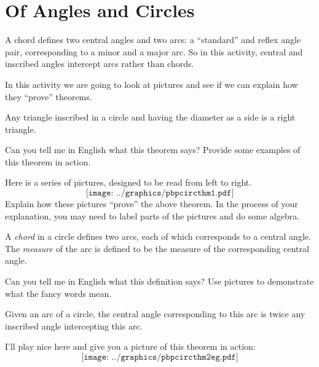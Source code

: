 \newpage
\section{Of Angles and Circles} %

\begin{teachingnote}
A chord defines two central angles and two arcs: a ``standard'' and reflex angle pair, corresponding to a minor and a major arc.  So in this activity, central and inscribed angles intercept arcs rather than chords.
\end{teachingnote}

In this activity we are going to look at pictures and see if we can
explain how they ``prove'' theorems.

\begin{theorem} 
Any triangle inscribed in a circle and having the diameter as a side is a
right triangle.
\end{theorem}

\begin{prob}
Can you tell me in English what this theorem says? Provide some
examples of this theorem in action.
\end{prob}

\begin{prob} 
Here is a series of pictures, designed to be read from left to right.
\[
\texttt{[image: ../graphics/pbpcircthm1.pdf]}
\]
Explain how these pictures ``prove'' the above theorem. In the process
of your explanation, you may need to label parts of the pictures and
do some algebra.
\end{prob}

\begin{definition}
A \emph{chord} in a circle defines two {arcs}, each of which corresponds to a {central angle}.  The \emph{measure} of the arc is defined to be the measure of the corresponding central angle.  
\end{definition}

\begin{prob}
Can you tell me in English what this definition says? Use pictures to demonstrate what the fancy words mean.  
\end{prob}

\begin{theorem} 
Given an arc of a circle, the central angle corresponding to this arc is
twice any inscribed angle intercepting this arc.
\end{theorem}

I'll play nice here and give you a picture of this theorem in action:
\[
\texttt{[image: ../graphics/pbpcircthm2eg.pdf]}
\]

